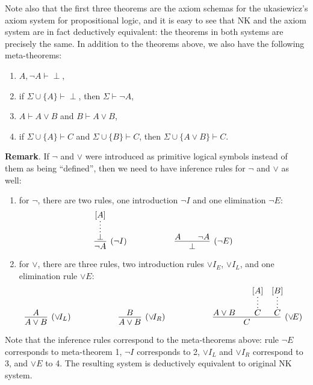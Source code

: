 \documentclass[12pt]{article}
\begin{document}
Note also that the first three theorems are the axiom schemas for the \text{\L}ukasiewicz's axiom system for propositional logic, and it is easy to see that NK and the axiom system are in fact deductively equivalent: the theorems in both systems are precisely the same.  In addition to the theorems above, we also have the following meta-theorems:
\begin{enumerate}
\item $A, \neg A \vdash \perp$,
\item if $\Sigma \cup \lbrace A \rbrace \vdash \perp$, then $\Sigma\vdash \neg A$,
\item $A \vdash A\lor B$ and $B \vdash A\lor B$,
\item if $\Sigma \cup \lbrace A \rbrace \vdash C$ and $\Sigma \cup \lbrace B \rbrace \vdash C$, then $\Sigma \cup \lbrace A\lor B\rbrace \vdash C$.
\end{enumerate}
\textbf{Remark}.  If $\neg$ and $\lor$ were introduced as primitive logical symbols instead of them as being ``defined'', then we need to have inference rules for $\neg$ and $\lor$ as well:
\begin{enumerate}
\item for $\neg$, there are two rules, one introduction $\neg I$ and one elimination $\neg E$:
$$ \infer[(\neg I)]{\neg A}{\infer*{\perp}{[A]}} \hspace{2cm} \infer[(\neg E)]{\perp}{A & \quad \neg A}$$
\item for $\lor$, there are three rules, two introduction rules $\lor\!I_E$, $\lor\!I_L$, and one elimination rule $\lor\! E$:
$$\infer[(\lor\!I_L)]{A\lor B}{A}  \hspace{2cm} \infer[(\lor\!I_R)]{A\lor B}{B} \hspace{2cm} \infer[(\lor\!E)]{C}{A \lor B & \quad \infer*{C}{[A]} \quad \infer*{C}{[B]}}$$
\end{enumerate}
Note that the inference rules correspond to the meta-theorems above: rule $\neg E$ corresponds to meta-theorem 1, $\neg  I$ corresponds to 2, $\lor\!I_L$ and $\lor\!I_R$ correspond to 3, and $\lor\!E$ to 4.  The resulting system is deductively equivalent to original NK system.

\end{document}

